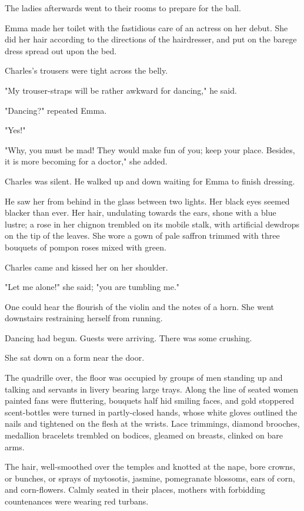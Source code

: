 \documentclass{tufte-book}
\begin{document}
The ladies afterwards went to their rooms to prepare for the ball.

Emma made her toilet with the fastidious care of an actress on her
debut. She did her hair according to the directions of the hairdresser,
and put on the barege dress spread out upon the bed.

Charles's trousers were tight across the belly.

"My trouser-straps will be rather awkward for dancing," he said.

"Dancing?" repeated Emma.

"Yes!"

"Why, you must be mad! They would make fun of you; keep your place.
Besides, it is more becoming for a doctor," she added.

Charles was silent. He walked up and down waiting for Emma to finish
dressing.

He saw her from behind in the glass between two lights. Her black eyes
seemed blacker than ever. Her hair, undulating towards the ears, shone
with a blue lustre; a rose in her chignon trembled on its mobile stalk,
with artificial dewdrops on the tip of the leaves. She wore a gown of
pale saffron trimmed with three bouquets of pompon roses mixed with
green.

Charles came and kissed her on her shoulder.

"Let me alone!" she said; "you are tumbling me."

One could hear the flourish of the violin and the notes of a horn. She
went downstairs restraining herself from running.

Dancing had begun. Guests were arriving. There was some crushing.

She sat down on a form near the door.

The quadrille over, the floor was occupied by groups of men standing up
and talking and servants in livery bearing large trays. Along the line
of seated women painted fans were fluttering, bouquets half hid smiling
faces, and gold stoppered scent-bottles were turned in partly-closed
hands, whose white gloves outlined the nails and tightened on the flesh
at the wrists. Lace trimmings, diamond brooches, medallion bracelets
trembled on bodices, gleamed on breasts, clinked on bare arms.

The hair, well-smoothed over the temples and knotted at the nape,
bore crowns, or bunches, or sprays of mytosotis, jasmine, pomegranate
blossoms, ears of corn, and corn-flowers. Calmly seated in their places,
mothers with forbidding countenances were wearing red turbans.
\end{document}
